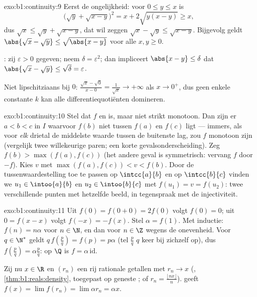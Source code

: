 \begin{solution}{exo:b1:continuity:9}
Eerst de ongelijkheid: voor $0 \leq y \leq x$ is
\[
\bigl(\sqrt y + \sqrt{x - y}\bigr)^2 = x + 2\sqrt{y(x-y)} \geq x,
\]
dus $\sqrt x \leq \sqrt y + \sqrt{x - y}$, dat wil zeggen $\sqrt x -
\sqrt y \leq \sqrt{x - y}$. Bijgevolg geldt $\abs{\sqrt x - \sqrt y}
\leq \sqrt{\abs{x - y}}$ voor alle $x, y \geq 0$.

: zij $\varepsilon > 0$ gegeven; neem $\delta =
\varepsilon^2$; dan impliceert $\abs{x - y} \leq \delta$ dat
$\abs{\sqrt x - \sqrt y} \leq \sqrt\delta = \varepsilon$.

Niet lipschitziaans bij $0$: $\frac{\sqrt x - \sqrt 0}{x - 0} =
\frac{1}{\sqrt x} \to +\infty$ als $x \to 0^+$, dus geen enkele
constante $k$ kan alle differentiequotiënten domineren.
\end{solution}

\begin{solution}{exo:b1:continuity:10}
Stel dat $f$  en  is, maar niet strikt monotoon. Dan
zijn er $a < b < c$ in $I$ waarvoor $f(b)$ niet tussen $f(a)$ en
$f(c)$ ligt --- immers, als voor \emph{elk} drietal de middelste
waarde tussen de buitenste lag, zou $f$ monotoon zijn (vergelijk
twee willekeurige paren; een korte gevalsonderscheiding). Zeg $f(b)
> \max(f(a), f(c))$ (het andere geval is symmetrisch: vervang $f$
door $-f$). Kies $v$ met $\max(f(a), f(c)) < v < f(b)$. Door de
tussenwaardestelling toe te passen op $\intcc{a}{b}$ en op
$\intcc{b}{c}$ vinden we $u_1 \in \intoo{a}{b}$ en $u_2 \in
\intoo{b}{c}$ met $f(u_1) = v = f(u_2)$: twee verschillende punten
met hetzelfde beeld, in tegenspraak met de injectiviteit.
\end{solution}

\begin{solution}{exo:b1:continuity:11}
Uit $f(0) = f(0+0) = 2f(0)$ volgt $f(0) = 0$; uit $0 = f(x - x)$
volgt $f(-x) = -f(x)$. Stel $\alpha = f(1)$. Met inductie: $f(n) =
n\alpha$ voor $n \in \N$, en dan voor $n \in \Z$ wegens de
oneven\-heid. Voor $q \in \N^*$ geldt $q\,f(\frac pq) = f(p) =
p\alpha$ (tel $\frac pq$ $q$ keer bij zichzelf op), dus $f(\frac pq)
= \alpha\frac pq$: op $\Q$ is $f = \alpha\,\mathrm{id}$.

Zij nu $x \in \R$ en $(r_n)$ een rij rationale getallen met $r_n \to
x$ (, \cref{thm:b1:reals:density}, toegepast op geneste
; of $r_n = \frac{\lfloor nx\rfloor}{n}$). 
geeft $f(x) = \lim f(r_n) = \lim \alpha r_n = \alpha x$.
\end{solution}

